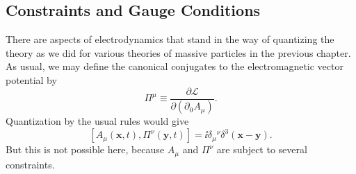 
\subsection{Constraints and Gauge Conditions}

There are aspects of electrodynamics that stand in the way of quantizing
the theory as we did for various theories of massive particles in the
previous chapter. As usual, we may define the canonical conjugates to the
electromagnetic vector potential by
\begin{equation}
  \Pi^\mu\equiv\frac{\partial\mathcal L}{\partial(\partial_0A_\mu)}.
  \tag{8.2.1}\label{eq:8.2.1}
\end{equation}
Quantization by the usual rules would give
\[
  [A_\mu(\mathbf x,t),\Pi^\nu(\mathbf y,t)]
  =\ii\delta_\mu{}^\nu\delta^3(\mathbf x-\mathbf y).
\]
But this is not possible here, because $A_\mu$ and $\Pi^\nu$ are subject to
several constraints.

